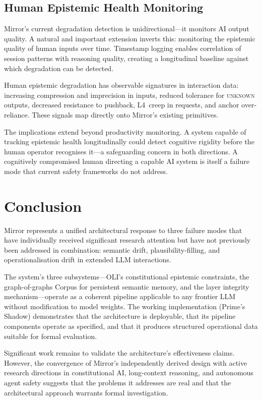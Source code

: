 \documentclass[11pt,a4paper]{article}
\begin{document}
\subsection{Human Epistemic Health Monitoring}

Mirror's current degradation detection is unidirectional---it monitors AI output quality.
A natural and important extension inverts this: monitoring the epistemic quality of human inputs over time.
Timestamp logging enables correlation of session patterns with reasoning quality, creating a longitudinal baseline against which degradation can be detected.

Human epistemic degradation has observable signatures in interaction data: increasing compression and imprecision in inputs, reduced tolerance for \textsc{unknown} outputs, decreased resistance to pushback, L4~creep in requests, and anchor over-reliance.
These signals map directly onto Mirror's existing primitives.

The implications extend beyond productivity monitoring.
A system capable of tracking epistemic health longitudinally could detect cognitive rigidity before the human operator recognises it---a safeguarding concern in both directions.
A cognitively compromised human directing a capable AI system is itself a failure mode that current safety frameworks do not address.

\section{Conclusion}
\label{sec:conclusion}

Mirror represents a unified architectural response to three failure modes that have individually received significant research attention but have not previously been addressed in combination: semantic drift, plausibility-filling, and operationalisation drift in extended LLM interactions.

The system's three subsystems---OLI's constitutional epistemic constraints, the graph-of-graphs Corpus for persistent semantic memory, and the layer integrity mechanism---operate as a coherent pipeline applicable to any frontier LLM without modification to model weights.
The working implementation (Prime's Shadow) demonstrates that the architecture is deployable, that its pipeline components operate as specified, and that it produces structured operational data suitable for formal evaluation.

Significant work remains to validate the architecture's effectiveness claims.
However, the convergence of Mirror's independently derived design with active research directions in constitutional AI, long-context reasoning, and autonomous agent safety suggests that the problems it addresses are real and that the architectural approach warrants formal investigation.
\end{document}
